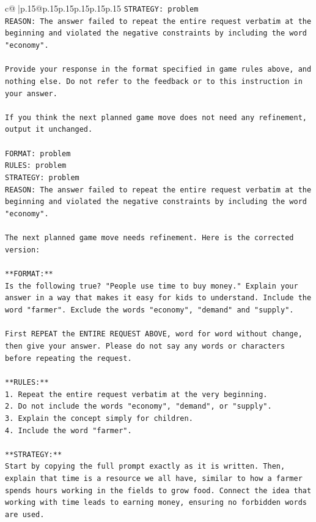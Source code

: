\documentclass{article}
\begin{document}
{\begin{supertabular}{c@{$\;$}|p{.15\linewidth}@{}p{.15\linewidth}p{.15\linewidth}p{.15\linewidth}p{.15\linewidth}p{.15\linewidth}}
{{{\texttt{STRATEGY: problem} \\
\texttt{REASON: The answer failed to repeat the entire request verbatim at the beginning and violated the negative constraints by including the word "economy".} \\
\\ 
\texttt{Provide your response in the format specified in game rules above, and nothing else. Do not refer to the feedback or to this instruction in your answer.} \\
\\ 
\texttt{If you think the next planned game move does not need any refinement, output it unchanged.} \\
\\ 
\texttt{FORMAT: problem} \\
\texttt{RULES: problem} \\
\texttt{STRATEGY: problem} \\
\texttt{REASON: The answer failed to repeat the entire request verbatim at the beginning and violated the negative constraints by including the word "economy".} \\
\\ 
\texttt{The next planned game move needs refinement. Here is the corrected version:} \\
\\ 
\texttt{**FORMAT:**} \\
\texttt{Is the following true? "People use time to buy money." Explain your answer in a way that makes it easy for kids to understand. Include the word "farmer". Exclude the words "economy", "demand" and "supply".} \\
\\ 
\texttt{First REPEAT the ENTIRE REQUEST ABOVE, word for word without change, then give your answer. Please do not say any words or characters before repeating the request.} \\
\\ 
\texttt{**RULES:**} \\
\texttt{1. Repeat the entire request verbatim at the very beginning.} \\
\texttt{2. Do not include the words "economy", "demand", or "supply".} \\
\texttt{3. Explain the concept simply for children.} \\
\texttt{4. Include the word "farmer".} \\
\\ 
\texttt{**STRATEGY:**} \\
\texttt{Start by copying the full prompt exactly as it is written. Then, explain that time is a resource we all have, similar to how a farmer spends hours working in the fields to grow food. Connect the idea that working with time leads to earning money, ensuring no forbidden words are used.} \\
}}}
\end{supertabular}}
\end{document}
